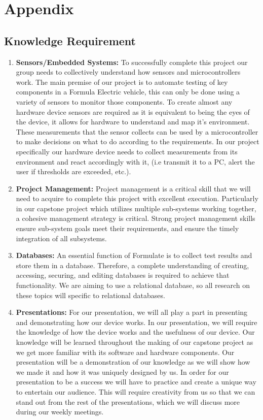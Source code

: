 \documentclass[12pt]{article}
\begin{document}
\newpage

\section{Appendix}

\subsection{Knowledge Requirement}
\begin{enumerate}
  \item \textbf{Sensors/Embedded Systems:} To successfully complete this project our group needs to collectively understand how sensors and microcontrollers work. The main premise of our project is to automate testing of key components in a Formula Electric vehicle, this can only be done using a variety of sensors to monitor those components. To create almost any hardware device sensors are required as it is equivalent to being the eyes of the device, it allows for hardware to understand and map it's environment. These measurements that the sensor collects can be used by a microcontroller to make decisions on what to do according to the requirements. In our project specifically our hardware device needs to collect measurements from its environment and react accordingly with it, (i.e transmit it to a PC, alert the user if thresholds are exceeded, etc.).
  
  \item \textbf{Project Management:} Project management is a critical skill that we will need to acquire to complete this project with excellent execution. Particularly in our capstone project which utilizes multiple sub-systems working together, a cohesive management strategy is critical. Strong project management skills ensure sub-system goals meet their requirements, and ensure the timely integration of all subsystems.
  
  \item \textbf{Databases:} An essential function of Formulate is to collect test results and store them in a database. Therefore, a complete understanding of creating, accessing, securing, and editing databases is required to achieve that functionality. We are aiming to use a relational database, so all research on these topics will specific to relational databases.
  
  \item \textbf{Presentations:} For our presentation, we will all play a part in presenting and demonstrating how our device works. In our presentation, we will require the knowledge of how the device works and the usefulness of our device. Our knowledge will be learned throughout the making of our capstone project as we get more familiar with its software and hardware components. Our presentation will be a demonstration of our knowledge as we will show how we made it and how it was uniquely designed by us. In order for our presentation to be a success we will have to practice and create a unique way to entertain our audience. This will require creativity from us so that we can stand out from the rest of the presentations, which we will discuss more during our weekly meetings.
  
\end{enumerate}
\end{document}
